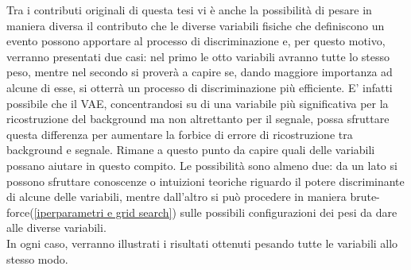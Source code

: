Tra i contributi originali di questa tesi vi è anche la possibilità di pesare in maniera diversa il contributo che le diverse variabili fisiche che definiscono un evento possono apportare al processo di discriminazione e, per questo motivo, verranno presentati due casi: nel primo le otto variabili avranno tutte lo stesso peso, mentre nel secondo si proverà a capire se, dando maggiore importanza ad alcune di esse, si otterrà un processo di discriminazione più efficiente. E' infatti possibile che il VAE, concentrandosi su di una variabile più significativa per la ricostruzione del background ma non altrettanto per il segnale, possa sfruttare questa differenza per aumentare la forbice di errore di ricostruzione tra background e segnale. Rimane a questo punto da capire quali delle variabili possano aiutare in questo compito. Le possibilità sono almeno due: da un lato si possono sfruttare conoscenze o intuizioni teoriche riguardo il potere discriminante di alcune delle variabili, mentre dall'altro si può procedere in maniera brute-force(\ref{iperparametri e grid search}) sulle possibili configurazioni dei pesi da dare alle diverse variabili.\\
In ogni caso, verranno illustrati i risultati ottenuti pesando tutte le variabili allo stesso modo. \\

\newpage


